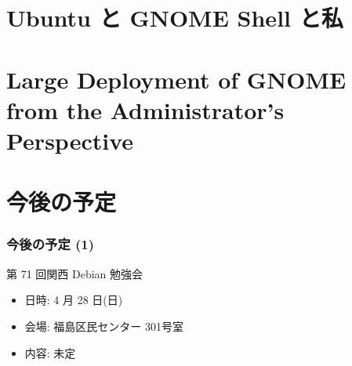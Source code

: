 \documentclass[cjk,dvipdfmx,10pt,compress,%
hyperref={bookmarks=true,bookmarksnumbered=true,bookmarksopen=false,%
colorlinks=false,%
pdftitle={第 70 回 関西 Debian 勉強会},%
pdfauthor={倉敷・のがた・佐々木・かわだ・八津尾},%
pdfsubject={資料},%
}]{beamer}
\begin{document}

\section{Ubuntu と GNOME Shell と私}


\section{Large Deployment of GNOME from the Administrator's Perspective}


\section{今後の予定}
\begin{frame}[fragile]
\frametitle{今後の予定 (1)}

\begin{block}{第 71 回関西 Debian 勉強会}
  \begin{itemize}
  \item 日時: 4 月 28 日(日)
  \item 会場: 福島区民センター 301号室
  \item 内容: 未定
  \end{itemize}
\end{block}

\end{frame}
\end{document}
